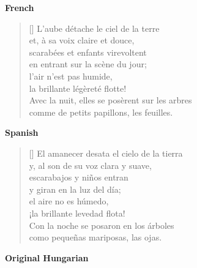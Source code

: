 \documentclass[a4paper,12pt,twoside,final]{book}
\begin{document}
\noindent \textbf{French}


\settowidth{\versewidth}{Avec la nuit, elles se posèrent sur les arbres}

\begin{verse}[\versewidth]
  L'aube détache le ciel de la terre \\
  et, à sa voix claire et douce, \\
  scarabées et enfants virevoltent \\
  en entrant sur la scène du jour; \\
  l'air n'est pas humide, \\
  la brillante légèreté flotte! \\
  Avec la nuit, elles se posèrent sur les arbres \\
  comme de petits papillons, les feuilles. \\
\end{verse}

\newpage


\noindent \textbf{Spanish}


\settowidth{\versewidth}{Con la noche se posaron en los árboles}

\begin{verse}[\versewidth]
  El amanecer desata el cielo de la tierra \\
  y, al son de su voz clara y suave, \\
  escarabajos y niños entran \\
  y giran en la luz del día; \\
  el aire no es húmedo, \\
  ¡la brillante levedad flota! \\
  Con la noche se posaron en los árboles \\
  como pequeñas mariposas, las ojas. \\
\end{verse}


\noindent \textbf{Original Hungarian}


\end{document}
